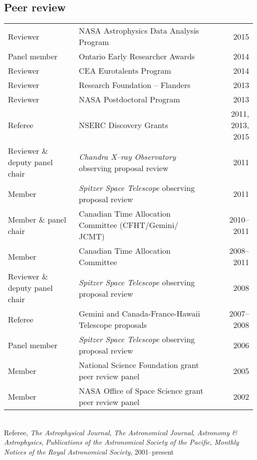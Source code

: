 \documentclass[12pt]{article}
\begin{document}
\subsection{Peer review}
\begin{tabularx}{\textwidth}{lXr}
Reviewer& NASA Astrophysics Data Analysis Program& 2015\\
Panel member & Ontario Early Researcher Awards & 2014\\
Reviewer&  CEA Eurotalents Program & 2014\\
Reviewer& Research Foundation -- Flanders& 2013\\
Reviewer& NASA Postdoctoral Program& 2013\\
Referee& NSERC Discovery Grants& 2011, 2013, 2015\\
Reviewer \& deputy panel chair& {\it Chandra X--ray Observatory\/} observing proposal review& 2011\\
Member& {\it Spitzer Space Telescope\/} observing proposal review& 2011\\
Member \& panel chair& Canadian Time Allocation Committee (CFHT/Gemini/ JCMT)& 2010--2011\\
Member& Canadian Time Allocation Committee& 2008--2011\\
Reviewer \& deputy panel chair& {\it Spitzer Space Telescope\/} observing proposal review& 2008\\
Referee& Gemini and Canada-France-Hawaii Telescope proposals& 2007--2008\\
Panel member& {\it Spitzer Space Telescope\/} observing proposal review& 2006\\
Member& National Science Foundation grant peer review panel& 2005\\
Member& NASA Office of Space Science grant peer review panel& 2002\\
\end{tabularx}\\
\vspace{0.3cm}
Referee, {\it The Astrophysical Journal}, {\it The Astronomical Journal}, {\it Astronomy \& Astrophysics},
{\it Publications of the Astronomical Society of the Pacific}, {\it Monthly Notices of the Royal Astronomical Society},
2001--present
\end{document}
